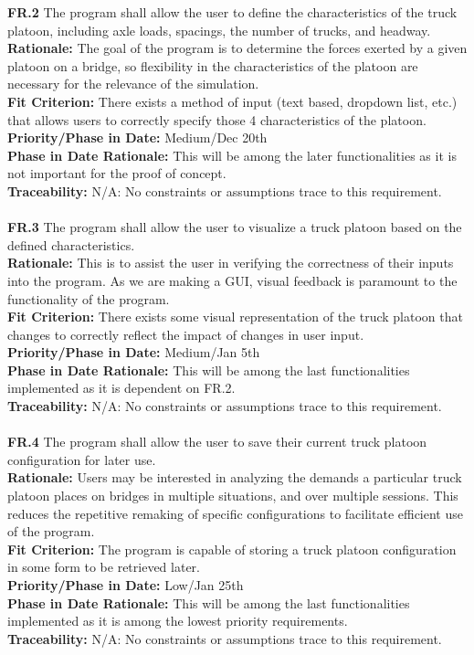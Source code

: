 \documentclass[12pt]{article}
\begin{document}
  \noindent\textbf{FR.2} The program shall allow the user to define the characteristics of the truck platoon, including axle loads, spacings, the number of trucks, and headway.\\
  \textbf{Rationale:} The goal of the program is to determine the forces exerted by a given platoon on a bridge, so flexibility in the characteristics
  of the platoon are necessary for the relevance of the simulation.\\ 
  \textbf{Fit Criterion:} There exists a method of input (text based, dropdown list, etc.) that allows users to correctly specify those 4 characteristics of the platoon.\\
  \textbf{Priority/Phase in Date:} Medium/Dec 20th\\
  \textbf{Phase in Date Rationale:} This will be among the later functionalities as it is not important for the proof of concept.\\
  \textbf{Traceability:} N/A: No constraints or assumptions trace to this requirement.\\\\

  \noindent\textbf{FR.3} The program shall allow the user to visualize a truck platoon based on the defined characteristics.\\
  \textbf{Rationale:} This is to assist the user in verifying the correctness of their inputs into the program. As we are making a GUI, visual feedback is paramount to the functionality of the program.\\
  \textbf{Fit Criterion:} There exists some visual representation of the truck platoon that changes to correctly reflect the impact of changes in user input.\\
  \textbf{Priority/Phase in Date:} Medium/Jan 5th\\
  \textbf{Phase in Date Rationale:} This will be among the last functionalities implemented as it is dependent on FR.2.\\
  \textbf{Traceability:} N/A: No constraints or assumptions trace to this requirement.\\\\

  \noindent\textbf{FR.4} The program shall allow the user to save their current truck platoon configuration for later use.\\
  \textbf{Rationale:} Users may be interested in analyzing the demands a particular truck platoon places on bridges
   in multiple situations, and over multiple sessions. This reduces the repetitive remaking of specific configurations to facilitate efficient use of the program.\\
  \textbf{Fit Criterion:} The program is capable of storing a truck platoon configuration in some form to be retrieved later.\\
  \textbf{Priority/Phase in Date:} Low/Jan 25th\\
  \textbf{Phase in Date Rationale:} This will be among the last functionalities implemented as it is among the lowest priority requirements.\\
  \textbf{Traceability:} N/A: No constraints or assumptions trace to this requirement.\\\\
\end{document}
